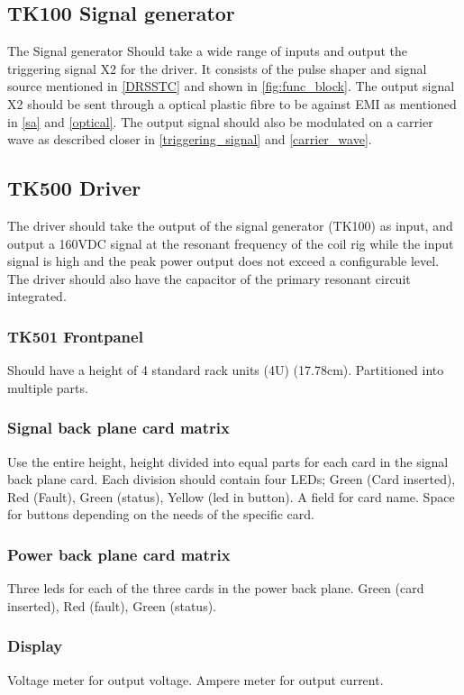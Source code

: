 \subsection{TK100 Signal generator}
The Signal generator Should take a wide range of inputs and output the triggering signal X2 for the driver. It consists of the pulse shaper and signal source mentioned in \cref{DRSSTC} and shown in \cref{fig:func_block}. The output signal X2 should be sent through a optical plastic fibre to be against EMI as mentioned in \cref{sa} and \cref{optical}. The output signal should also be modulated on a carrier wave as described closer in \cref{triggering_signal} and \cref{carrier_wave}.

\subsection{TK500 Driver}

The driver should take the output of the signal generator (TK100) as input, and output a 160VDC signal at the resonant frequency of the coil rig while the input signal is high and the peak power output does not exceed a configurable level. The driver should also have the capacitor of the primary resonant circuit integrated.

\subsubsection*{TK501 Frontpanel}
Should have a height of 4 standard rack units (4U) (17.78cm). Partitioned into multiple parts.
\subsubsection*{Signal back plane card matrix}
Use the entire height, height divided into equal parts for each card in the signal back plane card. Each division should contain four LEDs; Green (Card inserted), Red (Fault), Green (status), Yellow (led in button). A field for card name. Space for buttons depending on the needs of the specific card.

\subsubsection*{Power back plane card matrix}
Three leds for each of the three cards in the power back plane. Green (card inserted), Red (fault), Green (status).

\subsubsection*{Display}
Voltage meter for output voltage.
Ampere meter for output current.

